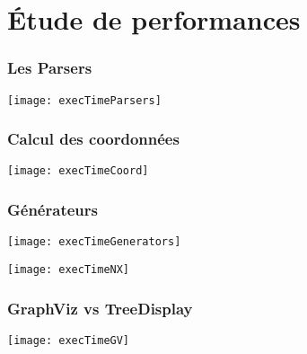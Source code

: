 \section{Étude de performances}

\begin{frame}
	\frametitle{Les Parsers}
	\begin{center}
	\texttt{[image: execTimeParsers]}
	\end{center}
\end{frame}

\begin{frame}
	\frametitle{Calcul des coordonnées}
	\begin{center}
	\texttt{[image: execTimeCoord]}
	\end{center}
\end{frame}

\begin{frame}[allowframebreaks]
	\frametitle{Générateurs}
	\begin{center}
	\texttt{[image: execTimeGenerators]}
	\end{center}
	\begin{center}
	\texttt{[image: execTimeNX]}
	\end{center}
\end{frame}

\begin{frame}
	\frametitle{GraphViz vs TreeDisplay}
	\begin{center}
	\texttt{[image: execTimeGV]}
	\end{center}
\end{frame}



